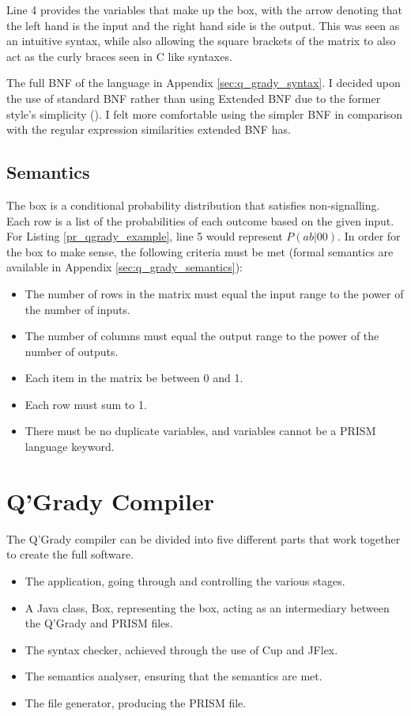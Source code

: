 \documentclass[report.tex]{subfiles}
\begin{document}
Line 4 provides the variables that make up the box, with the arrow denoting that
the left hand is the input and the right hand side is the output. This was seen
as an intuitive syntax, while also allowing the square brackets of the matrix to
also act as the curly braces seen in C like syntaxes.

The full BNF of the language in Appendix \ref{sec:q_grady_syntax}. I decided
upon the use of standard BNF rather than using Extended BNF due to the former
style's simplicity (\cite[chapter 2.3.4, p.~38]{Watt:1991:PLS:120468}). I felt
more comfortable using the simpler BNF in comparison with the regular expression
similarities extended BNF has.

\subsection{Semantics} %
\label{sec:semantics}
The box is a conditional probability distribution that satisfies non-signalling.
Each row is a list of the probabilities of each outcome based on the given
input. For Listing \ref{pr_qgrady_example}, line 5 would represent 
\(P(ab | 00)\). In order for the box to make sense, the following criteria must
be met (formal semantics are available in Appendix \ref{sec:q_grady_semantics}):
\begin{itemize}
    \item The number of rows in the matrix must equal the input range to the
    power of the number of inputs.
    \item The number of columns must equal the output range to the power of the
    number of outputs.
    \item Each item in the matrix be between 0 and 1.
    \item Each row must sum to 1.
    \item There must be no duplicate variables, and variables cannot be a PRISM
    language keyword.
\end{itemize}


\section{Q'Grady Compiler} %
\label{sec:q_grady_compiler}
The Q'Grady compiler can be divided into five different parts that work
together to create the full software.
\begin{itemize}
    \item The application, going through and controlling the various stages.
    \item A Java class, Box, representing the box, acting as an intermediary
    between the Q'Grady and PRISM files.
    \item The syntax checker, achieved through the use of Cup and JFlex.
    \item The semantics analyser, ensuring that the semantics are met.
    \item The file generator, producing the PRISM file.
\end{itemize}
\end{document}
